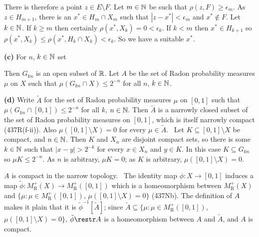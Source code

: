 {There is therefore a point $z\in E\setminus F$.   Let $m\in\Bbb N$ be
such that $\rho(z,F)\ge\epsilon_m$.   As $z\in H_{m+1}$, there is an
$x^*\in H_m\cap X_m$ such that
$|z-x^*|<\epsilon_m$ and $x^*\notin F$.   Let $k\in\Bbb N$.   If
$k\ge m$ then certainly $\rho(x^*,X_k)=0<\epsilon_k$.
If $k<m$ then $x^*\in H_{k+1}$ so
$\rho(x^*,X_k)\le\rho(x^*,H_k\cap X_k)<\epsilon_k$.   So we have a
suitable $x^*$.\ \Qed

\medskip

{\bf (c)} For $n$, $k\in\Bbb N$ set


\noindent Then $G_{kn}$ is an open subset of $\Bbb R$.   Let $A$ be the
set of Radon probability
measures $\mu$ on $X$ such that $\mu(G_{kn}\cap X)\le 2^{-n}$ for all
$n$,
$k\in\Bbb N$.

\medskip

{\bf (d)} Write $\tilde A$ for the set of Radon probability measures
$\mu$ on $[0,1]$ such that $\mu(G_{kn}\cap[0,1])\le 2^{-n}$ for all
$k$, $n\in\Bbb N$.   Then $\tilde A$ is a narrowly closed subset of the
set of Radon probability measures on $[0,1]$, which is itself narrowly
compact (437R(f-ii)).
Also $\mu([0,1]\setminus X)=0$ for every $\mu\in\tilde A$.   \Prf\ Let
$K\subseteq [0,1]\setminus X$ be compact, and $n\in\Bbb N$.   Then
$K$ and
$X_n$ are disjoint compact sets, so there is some $k\in\Bbb N$ such that
$|x-y|>2^{-k}$ for every $x\in X_n$ and $y\in K$.   In this case
$K\subseteq G_{kn}$ so
$\mu K\le 2^{-n}$.   As $n$ is arbitrary, $\mu K=0$;  as $K$ is
arbitrary, $\mu([0,1]\setminus X)=0$.\ \Qed

$A$ is compact in the narrow topology.   \Prf\
The identity map $\phi:X\to[0,1]$ induces a map
$\tilde\phi:M^+_{\text{R}}(X)\to M^+_{\text{R}}([0,1])$ which is a 
homeomorphism between $M^+_{\text{R}}(X)$ and
$\{\mu:\mu\in M^+_{\text{R}}([0,1])$, $\mu([0,1]\setminus X)=0\}$ (437Nb).
The definition of $A$ makes it plain that it is
$\tilde\phi^{-1}[\tilde A]$;  since
$\tilde A\subseteq\{\mu:\mu\in M^+_{\text{R}}([0,1])$,
$\mu([0,1]\setminus X)=0\}$, $\tilde\phi\restr A$ is a homeomorphism
between $A$ and $\tilde A$, and $A$ is compact.\ \Qed

\medskip

}
